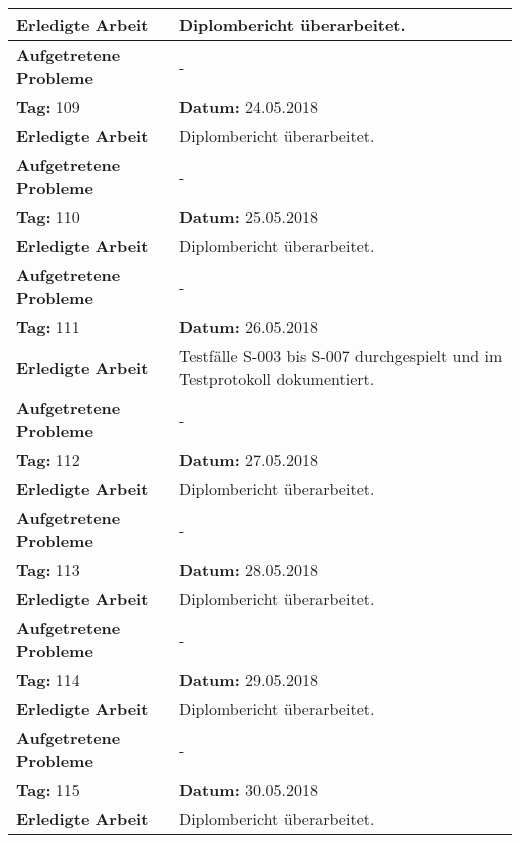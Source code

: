 \begin{longtable}{|p{5cm}|p{5cm}p{6cm}|}
\textbf{Erledigte Arbeit} & \multicolumn{2}{p{11cm}|}{Diplombericht überarbeitet.} \\ \hline
\textbf{Aufgetretene Probleme} & \multicolumn{2}{p{11cm}|}{-} \\ \hline
\rowcolor{heading}\textbf{Tag:} 109 & \textbf{Datum:} 24.05.2018 & \\ \hline
\textbf{Erledigte Arbeit} & \multicolumn{2}{p{11cm}|}{Diplombericht überarbeitet.} \\ \hline
\textbf{Aufgetretene Probleme} & \multicolumn{2}{p{11cm}|}{-} \\ \hline
\rowcolor{heading}\textbf{Tag:} 110 & \textbf{Datum:} 25.05.2018 & \\ \hline
\textbf{Erledigte Arbeit} & \multicolumn{2}{p{11cm}|}{Diplombericht überarbeitet.} \\ \hline
\textbf{Aufgetretene Probleme} & \multicolumn{2}{p{11cm}|}{-} \\ \hline
\rowcolor{heading}\textbf{Tag:} 111 & \textbf{Datum:} 26.05.2018 & \\ \hline
\textbf{Erledigte Arbeit} & \multicolumn{2}{p{11cm}|}{Testfälle S-003 bis S-007 durchgespielt und im Testprotokoll dokumentiert.} \\ \hline
\textbf{Aufgetretene Probleme} & \multicolumn{2}{p{11cm}|}{-} \\ \hline
\rowcolor{heading}\textbf{Tag:} 112 & \textbf{Datum:} 27.05.2018 & \\ \hline
\textbf{Erledigte Arbeit} & \multicolumn{2}{p{11cm}|}{Diplombericht überarbeitet.} \\ \hline
\textbf{Aufgetretene Probleme} & \multicolumn{2}{p{11cm}|}{-} \\ \hline
\rowcolor{heading}\textbf{Tag:} 113 & \textbf{Datum:} 28.05.2018 & \\ \hline
\textbf{Erledigte Arbeit} & \multicolumn{2}{p{11cm}|}{Diplombericht überarbeitet.} \\ \hline
\textbf{Aufgetretene Probleme} & \multicolumn{2}{p{11cm}|}{-} \\ \hline
\rowcolor{heading}\textbf{Tag:} 114 & \textbf{Datum:} 29.05.2018 & \\ \hline
\textbf{Erledigte Arbeit} & \multicolumn{2}{p{11cm}|}{Diplombericht überarbeitet.} \\ \hline
\textbf{Aufgetretene Probleme} & \multicolumn{2}{p{11cm}|}{-} \\ \hline
\rowcolor{heading}\textbf{Tag:} 115 & \textbf{Datum:} 30.05.2018 & \\ \hline
\textbf{Erledigte Arbeit} & \multicolumn{2}{p{11cm}|}{Diplombericht überarbeitet.} \\ \hline

\end{longtable}
